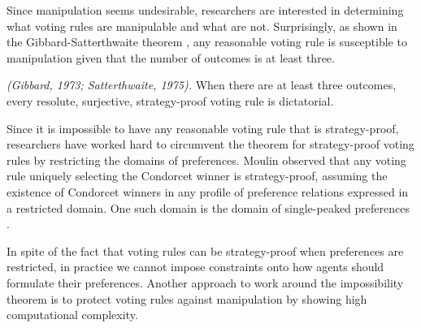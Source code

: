 Since manipulation seems undesirable, researchers are
interested in determining what voting rules are
manipulable and what are not.
Surprisingly, as shown in the Gibbard-Satterthwaite
theorem \cite{gib:j:maip-scheme,satt:j:strat-proof},
any reasonable voting rule is susceptible to
manipulation given that the number of outcomes
is at least three.

\begin{thm}
\label{thm:Gib_Sat}
\emph{(Gibbard, 1973; Satterthwaite, 1975).}
	When there are at least three outcomes,
	every resolute, surjective, strategy-proof voting rule is
	dictatorial.
\end{thm}

Since it is impossible to have any reasonable voting rule that is strategy-proof,
researchers have worked hard to circumvent the theorem
for strategy-proof voting rules by restricting the domains
of preferences\cite{Brandt:COMSOC}.
Moulin \cite{Moul} observed that any voting rule uniquely selecting
the Condorcet winner is strategy-proof, assuming the existence
of Condorcet winners in any profile of preference relations
expressed in a restricted domain.
One such domain is the domain of single-peaked preferences
\cite{Sprumont}.

In spite of the fact that voting rules can be strategy-proof
when preferences are restricted, in practice we cannot impose
constraints onto how agents should formulate their preferences.
Another approach to work around the impossibility theorem is
to protect voting rules against manipulation by showing
high computational complexity.

%
